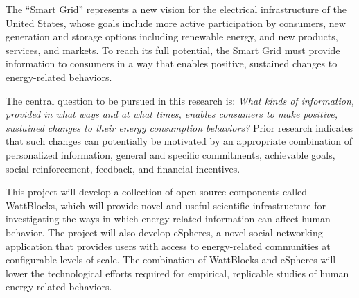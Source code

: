\documentclass{proposalnsf}
\begin{document}




  The ``Smart Grid'' represents a new vision for
the electrical infrastructure of the United States, whose goals include
more active participation by consumers, new generation and storage options
including renewable energy, and new products, services, and markets.  To
reach its full potential, the Smart Grid must provide information to
consumers in a way that enables positive, sustained changes to
energy-related behaviors.  

The central question to be pursued in this research is: {\em What kinds of
  information, provided in what ways and at what times, enables consumers
  to make positive, sustained changes to their energy consumption
  behaviors?}  Prior research indicates that such changes can potentially
be motivated by an appropriate combination of personalized information,
general and specific commitments, achievable goals, social reinforcement,
feedback, and financial incentives.

\medskip

 This project will develop a collection
of open source components called WattBlocks, which  will provide novel and
useful scientific infrastructure for investigating the ways in which
energy-related information can affect human behavior. The project will also
develop eSpheres, a novel social networking application that provides users
with access to energy-related communities at configurable levels of
scale. The combination of WattBlocks and eSpheres will lower the technological 
efforts required for empirical, replicable studies of human energy-related
behaviors.    
\end{document}
